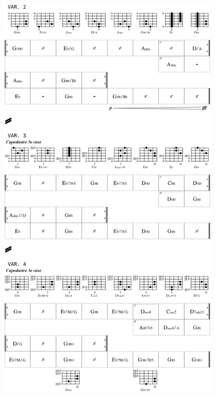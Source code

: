  \begin{figure}[H]
\begin{center}
\includegraphics[width=\textwidth]{img/dlc3}
\end{center}
\end{figure}


